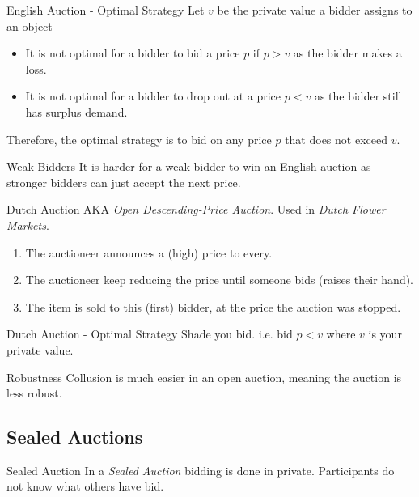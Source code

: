 \documentclass[11pt,a4paper]{article}
\begin{document}
\begin{proposition}{English Auction - Optimal Strategy}
  Let $v$ be the private value a bidder assigns to an object
  \begin{itemize}
    \item It is not optimal for a bidder to bid a price $p$ if $p>v$ as the bidder makes a loss.
    \item It is not optimal for a bidder to drop out at a price $p<v$ as the bidder still has surplus demand.
  \end{itemize}
  Therefore, the optimal strategy is to bid on any price $p$ that does not exceed $v$.
\end{proposition}

\begin{remark}{Weak Bidders}
  It is harder for a weak bidder to win an English auction as stronger bidders can just accept the next price.
\end{remark}

\begin{definition}{Dutch Auction}
  AKA \textit{Open Descending-Price Auction}. Used in \textit{Dutch Flower Markets}.
  \begin{enumerate}
    \item The auctioneer announces a (high) price to every.
    \item The auctioneer keep reducing the price until someone bids (raises their hand).
    \item The item is sold to this (first) bidder, at the price the auction was stopped.
  \end{enumerate}
\end{definition}

\begin{proposition}{Dutch Auction - Optimal Strategy}
  Shade you bid. i.e. bid $p<v$ where $v$ is your private value.
\end{proposition}

\begin{remark}{Robustness}
  Collusion is much easier in an open auction, meaning the auction is less robust.
\end{remark}

\subsection{Sealed Auctions}

\begin{definition}{Sealed Auction}
  In a \textit{Sealed Auction} bidding is done in private. Participants do not know what others have bid.
\end{definition}
\end{document}
